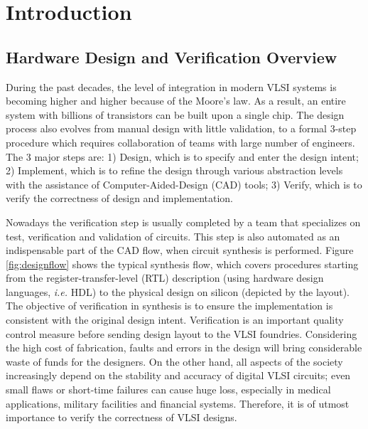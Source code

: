 \chapter{Introduction}
\label{ch:intro}





\section{Hardware Design and Verification Overview}
During the past decades, the level of integration in modern VLSI systems is becoming higher and higher because of the Moore's law.
As a result, an entire system with billions of transistors can be built upon a single chip.
The design process also evolves from manual design with little validation, to 
a formal 3-step procedure which requires collaboration of teams with large number of 
engineers. The 3 major steps are: 1) Design, which is to specify and enter the design intent;
2) Implement, which is to refine the design through various abstraction levels with the assistance of Computer-Aided-Design (CAD)
tools; 3) Verify, which is to verify the correctness of design and implementation.

Nowadays the verification step is usually completed by a team that specializes on test, verification and validation of 
circuits. This step is also automated as an indispensable part of the CAD flow, when circuit synthesis is performed. 
Figure \ref{fig:designflow} shows the typical synthesis flow, which covers procedures starting from the 
register-transfer-level (RTL) description (using hardware design languages, {\it i.e.} HDL) to  the 
physical design on silicon (depicted by the layout). The objective of verification in synthesis is 
to ensure the implementation is consistent with the original design intent. Verification is 
an important quality control measure before sending design layout to the VLSI foundries.
Considering the high cost of fabrication, faults and errors in the design will bring considerable 
waste of funds for the designers. On the other hand, all aspects of the society increasingly depend on 
the stability and accuracy of digital VLSI circuits; even small flaws or short-time failures can cause 
huge loss, especially in medical applications, military facilities and financial systems.
Therefore, it is of utmost importance to verify the correctness of VLSI designs.

